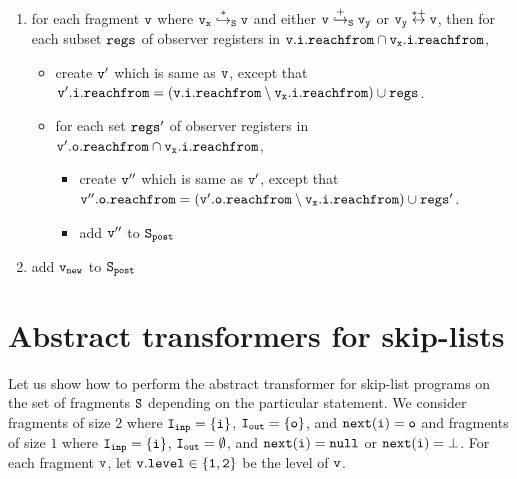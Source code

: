 \begin{itemize}
\begin{enumerate}
\item for each fragment $\tt v$ where $\tt v_x \overset{*}\hookrightarrow_S v$ and either $\tt v \overset{+}\hookrightarrow_S v_y$ or $\tt v_y \overset{*+}\leftrightarrow v$, then for each subset $\tt regs$ of observer registers in $\tt v.i.reachfrom \cap \tt v_x.i.reachfrom$, 
\begin{itemize}
\item create $\tt v'$ which is same as $\tt v$, except that $\tt v'.i.reachfrom = (\tt v.i.reachfrom \setminus v_x.i.reachfrom) \cup regs$. 
 \item for each set $\tt regs'$ of observer registers in $\tt v'.o.reachfrom \cap \tt v_x.i.reachfrom$,  
\begin{itemize}
\item create $\tt v''$ which is same as $\tt v'$, except that $\tt v''.o.reachfrom = (\tt v'.o.reachfrom \setminus v_x.i.reachfrom) \cup regs'$. 
\item add $\tt v''$ to $\tt S_{post}$
\end{itemize}
\end{itemize}
\item add $\tt v_{new}$ to $\tt S_{post}$
\end{enumerate}

\newpage

 \end{itemize}
\section{Abstract transformers for skip-lists}
Let us show how to perform the abstract transformer for skip-list programs on the set of fragments $\tt S$ depending on the particular statement.  We consider fragments of size $2$ where $\tt I_{inp} = \{i\}$, $\tt I_{out} = \{{o}\}$, and $\tt next(i) = {o}$ and fragments of size $1$ where $\tt I_{inp} = \{i\}$, $\tt I_{out} = \emptyset$, and $\tt next(i) = null$ or $\tt next(i) = \bot$. For each fragment $\tt v$, let $\tt v.level \in \{1,2\}$ be the level of $\tt v$.


